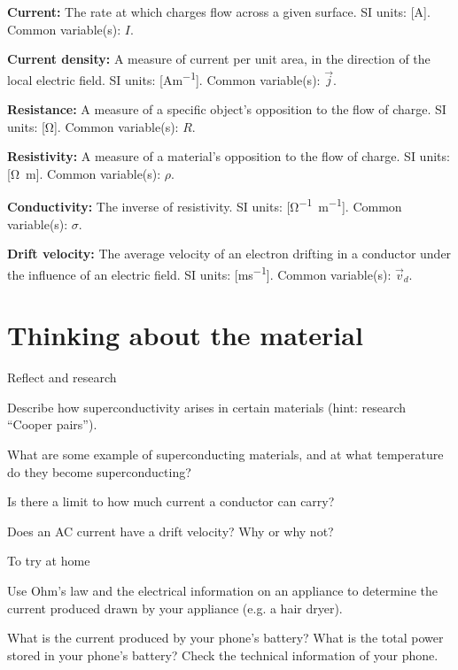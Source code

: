 \newpage
\begin{definitions}
	\item \textbf{Current:} The rate at which charges flow across a given surface. SI units: [\si{A}]. Common variable(s): $I$.
	\item \textbf{Current density:} A measure of current per unit area, in the direction of the local electric field. SI units: [\si{Am^{-1}}]. Common variable(s): $\vec j$.
	\item \textbf{Resistance:} A measure of a specific object's opposition to the flow of charge. SI units: [\si{\ohm}]. Common variable(s): $R$.
	\item \textbf{Resistivity:} A measure of a material's opposition to the flow of charge. SI units: [\si{\ohm m}]. Common variable(s): $\rho$.
	\item \textbf{Conductivity:} The inverse of resistivity. SI units: [\si{\ohm^{-1} m^{-1}}]. Common variable(s): $\sigma$.
	\item \textbf{Drift velocity:} The average velocity of an electron drifting in a conductor under the influence of an electric field. SI units: [\si{ms^{-1}}]. Common variable(s): $\vec v_{d}$.
\end{definitions}

\newpage
\section{Thinking about the material}

\begin{chapteractivity}{Reflect and research}
{
\item Describe how superconductivity arises in certain materials (hint: research ``Cooper pairs'').
\item What are some example of superconducting materials, and at what temperature do they become superconducting?
\item Is there a limit to how much current a conductor can carry?
\item Does an AC current have a drift velocity? Why or why not?
}
\end{chapteractivity}

\begin{chapteractivity}{To try at home}
{

\item Use Ohm's law and the electrical information on an appliance to determine the current produced drawn by your appliance (e.g. a hair dryer).
\item What is the current produced by your phone's battery? What is the total power stored in your phone's battery? Check the technical information of your phone.
}
\end{chapteractivity}

